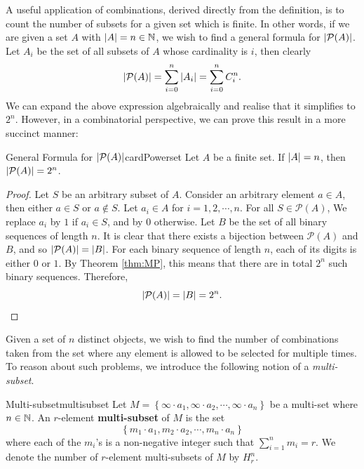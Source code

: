 \documentclass[math]{amznotes}
\theoremstyle{remark}
\newcommand{\0}{\mathbf{0}}
\newcommand{\1}{\mathbf{1}}
\begin{document}
A useful application of combinations, derived directly from the definition, is to count the number of subsets for a given set which is finite. In other words, if we are given a set $A$ with ${\left\lvert {A} \right\rvert} = n \in \mathbb{N}$, we wish to find a general formula for ${\left\lvert {\mathcal{P}(A)} \right\rvert}$. Let $A_i$ be the set of all subsets of $A$ whose cardinality is $i$, then clearly
\begin{equation*}
    {\left\lvert {\mathcal{P}(A)} \right\rvert} = \sum_{i = 0}^{n}{\left\lvert {A_i} \right\rvert} = \sum_{i = 0}^{n}C^n_i.
\end{equation*}
We can expand the above expression algebraically and realise that it simplifies to $2^n$. However, in a combinatorial perspective, we can prove this result in a more succinct manner:
\begin{thmbox}{General Formula for ${\left\lvert {\mathcal{P}(A)} \right\rvert}$}{cardPowerset}
    Let $A$ be a finite set. If ${\left\lvert {A} \right\rvert} = n$, then ${\left\lvert {\mathcal{P}(A)} \right\rvert} = 2^n$.
    \tcblower
    \begin{proof}
        Let $S$ be an arbitrary subset of $A$. Consider an arbitrary element $a \in A$, then either $a \in S$ or $a \notin S$. Let $a_i \in A$ for $i = 1, 2, \cdots, n$. For all $S \in \mathcal{P}(A)$, We replace $a_i$ by $1$ if $a_i \in S$, and by $0$ otherwise. Let $B$ be the set of all binary sequences of length $n$. It is clear that there exists a bijection between $\mathcal{P}(A)$ and $B$, and so ${\left\lvert {\mathcal{P}(A)} \right\rvert} = {\left\lvert {B} \right\rvert}$. For each binary sequence of length $n$, each of its digits is either $0$ or $1$. By Theorem \ref{thm:MP}, this means that there are in total $2^n$ such binary sequences. Therefore,
        \begin{equation*}
            {\left\lvert {\mathcal{P}(A)} \right\rvert} = {\left\lvert {B} \right\rvert} = 2^n.
        \end{equation*}
    \end{proof}
\end{thmbox}
Given a set of $n$ distinct objects, we wish to find the number of combinations taken from the set where any element is allowed to be selected for multiple times. To reason about such problems, we introduce the following notion of a \textit{multi-subset}.
\begin{dfnbox}{Multi-subset}{multisubset}
    Let $M = \left\{\infty \cdot a_1, \infty \cdot a_2, \cdots, \infty \cdot a_n\right\}$ be a multi-set where $n \in \mathbb{N}$. An $r$-element {\color{red} \textbf{multi-subset}} of $M$ is the set
    \begin{displaymath}
        \left\{m_1 \cdot a_1, m_2 \cdot a_2, \cdots, m_n \cdot a_n\right\}
    \end{displaymath}
    where each of the $m_i$'s is a non-negative integer such that $\sum_{i = 1}^{n}m_i = r$. We denote the number of $r$-element multi-subsets of $M$ by $H^n_r$.
\end{dfnbox}
\end{document}
